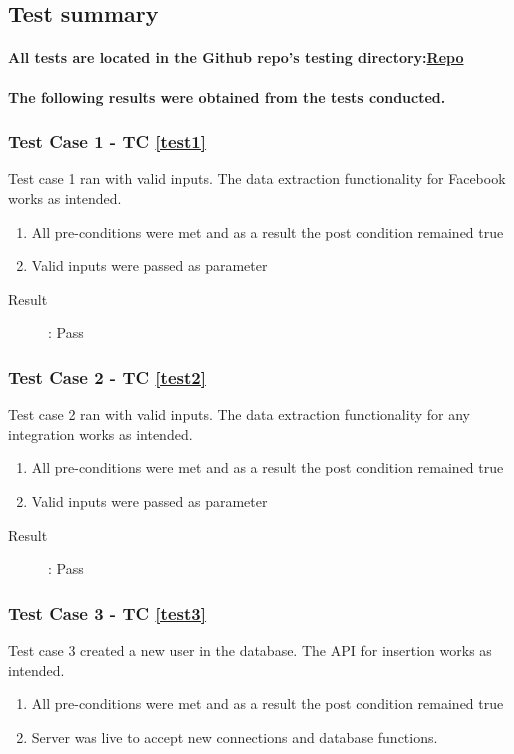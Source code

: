 \documentclass{article}
\begin{document}
\pagebreak

\subsection{Test summary}
\paragraph{All tests are located in the Github repo's testing directory:\href{https://github.com/QuintonWeenink/ValknutSolutions}{Repo}}

\paragraph{The following results were obtained from the tests conducted.}
\subsubsection{Test Case 1 - TC \ref{test1}}
Test case 1 ran with valid inputs.
The data extraction functionality for Facebook works as intended.
\begin{enumerate}
	\item All pre-conditions were met and as a result the post condition remained true
	\item Valid inputs were passed as parameter 
\end{enumerate}
\begin{description}
	\item [Result]: Pass 
\end{description}


\subsubsection{Test Case 2 - TC \ref{test2}}
Test case 2 ran with valid inputs.
The data extraction functionality for any integration works as intended.
\begin{enumerate}
	\item All pre-conditions were met and as a result the post condition remained true
	\item Valid inputs were passed as parameter 
\end{enumerate}

\begin{description}
	\item [Result]: Pass 
\end{description}


\subsubsection{Test Case 3 - TC \ref{test3}}
Test case 3 created a new user in the database.
The API for insertion works as intended.
\begin{enumerate}
	\item All pre-conditions were met and as a result the post condition remained true
	\item Server was live to accept new connections and database functions.
\end{enumerate}
\end{document}
